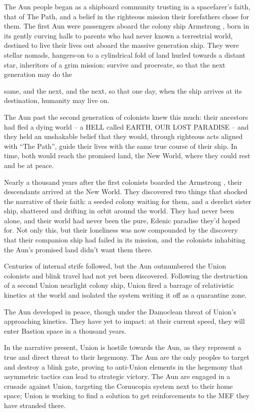 The Aun people began as a shipboard community trusting in a spacefarer's faith, that of The
Path, and a belief in the righteous mission their forefathers chose for them. The first Aun were
passengers aboard the colony ship Armstrong , born in its gently curving halls to parents who
had never known a terrestrial world, destined to live their lives out aboard the massive generation
ship. They were stellar nomads, hangers-on to a cylindrical fold of land hurled towards a distant
star, inheritors of a grim mission: survive and procreate, so that the next generation may do the




same, and the next, and the next, so that one day, when the ship arrives at its destination,
humanity may live on.


The Aun past the second generation of colonists knew this much: their ancestors had fled a
dying world -- a HELL called EARTH, OUR LOST PARADISE -- and they held an unshakable
belief that they would, through righteous acts aligned with “The Path”, guide their lives with the
same true course of their ship. In time, both would reach the promised land, the New World,
where they could rest and be at peace.


Nearly a thousand years after the first colonists boarded the Armstrong , their descendants
arrived at the New World. They discovered two things that shocked the narrative of their faith: a
seeded colony waiting for them, and a derelict sister ship, shattered and drifting in orbit around
the world. They had never been alone, and their world had never been the pure, Edenic paradise
they’d hoped for. Not only this, but their loneliness was now compounded by the discovery that
their companion ship had failed in its mission, and the colonists inhabiting the Aun’s promised
land didn’t want them there.


Centuries of internal strife followed, but the Aun outnumbered the Union colonists and blink
travel had not yet been discovered. Following the destruction of a second Union nearlight colony
ship, Union fired a barrage of relativistic kinetics at the world and isolated the system writing it
off as a quarantine zone.


The Aun developed in peace, though under the Damoclean threat of Union’s approaching
kinetics. They have yet to impact: at their current speed, they will enter Bastion space in a
thousand years.


In the narrative present, Union is hostile towards the Aun, as they represent a true and direct
threat to their hegemony. The Aun are the only peoples to target and destroy a blink gate,
proving to anti-Union elements in the hegemony that asymmetric tactics can lead to strategic
victory. The Aun are engaged in a crusade against Union, targeting the Cornucopia system next
to their home space; Union is working to find a solution to get reinforcements to the MEF they
have stranded there.


